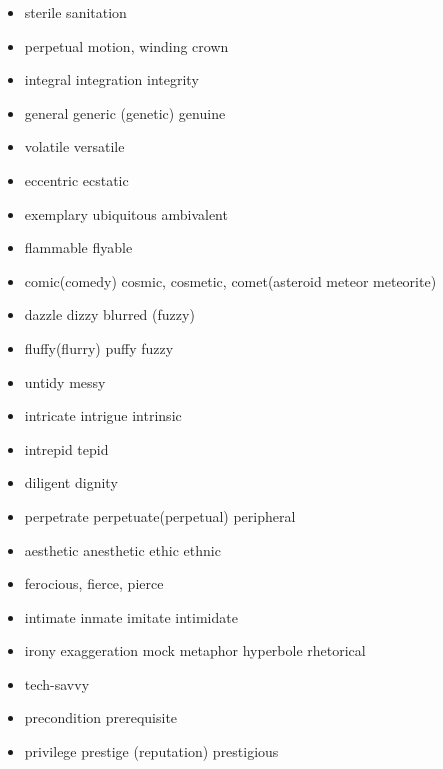 \documentclass[a4paper,11pt,twoside]{book}
\begin{document}
\begin{itemize}
	\item sterile sanitation

	\item perpetual motion, winding crown

	\item integral integration integrity 
	
	\item general generic (genetic) genuine

	\item volatile versatile
	
	\item eccentric ecstatic 
	
	\item exemplary ubiquitous ambivalent
	
	\item flammable flyable
	
	\item comic(comedy) cosmic, cosmetic, comet(asteroid meteor meteorite)
	
	\item dazzle dizzy blurred (fuzzy) 
	
	\item fluffy(flurry) puffy fuzzy
	
	\item untidy messy
	
	\item intricate intrigue intrinsic
	
	\item intrepid tepid 
	
	\item diligent dignity
	
	\item perpetrate perpetuate(perpetual) peripheral
	
	\item aesthetic anesthetic ethic ethnic
	
	\item ferocious, fierce, pierce
	
	\item intimate inmate imitate intimidate
	
	\item irony exaggeration mock metaphor hyperbole rhetorical
	
	\item tech-savvy
	
	\item precondition prerequisite
	
	\item privilege prestige (reputation) prestigious
	

\end{itemize}
\end{document}
